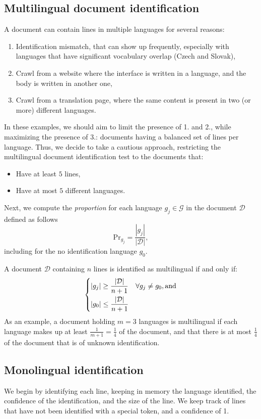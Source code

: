 \subsection{Multilingual document identification}

A document can contain lines in multiple languages for several reasons:
\begin{enumerate}
    \item Identification mismatch, that can show up frequently, especially with languages that have significant vocabulary overlap (Czech and Slovak),
    \item Crawl from a website where the interface is written in a language, and the body is written in another one,
    \item Crawl from a translation page, where the same content is present in two (or more) different languages.
\end{enumerate}

In these examples, we should aim to limit the presence of 1. and 2., while maximizing the presence of 3.: documents having a balanced set of lines per language. Thus, we decide to take a cautious approach, restricting the multilingual document identification test to the documents that:
\begin{itemize}
    \item Have at least $5$ lines,
    \item Have at most $5$ different languages.
\end{itemize}
Next, we compute the \emph{proportion} for each language $g_j \in \mathcal{G}$ in the document $\mathcal{D}$ defined as follows
\[
    \mathrm{Pr}_{g_j} = \frac{|g_j|}{|\mathcal{D}|},
\]
including for the no identification language $g_0$.

A document $\mathcal{D}$ containing $n$ lines is identified as multilingual if and only if:
\[
    \begin{dcases}
        |g_j| \ge \frac{|\mathcal{D}|}{n+1} & \forall g_j \neq g_0, \text{and} \\
        |g_0| \le \frac{|\mathcal{D}|}{n+1}
    \end{dcases}
\]
As an example, a document holding $m=3$ languages is multilingual if each language makes up at least $\frac{1}{m+1} = \frac{1}{4}$ of the document, and that there is at most $\frac{1}{4}$ of the document that is of unknown identification.

\subsection{Monolingual identification}
We begin by identifying each line, keeping in memory the language identified, the confidence of the identification, and the size of the line. We keep track of lines that have not been identified with a special token, and a confidence of 1.

